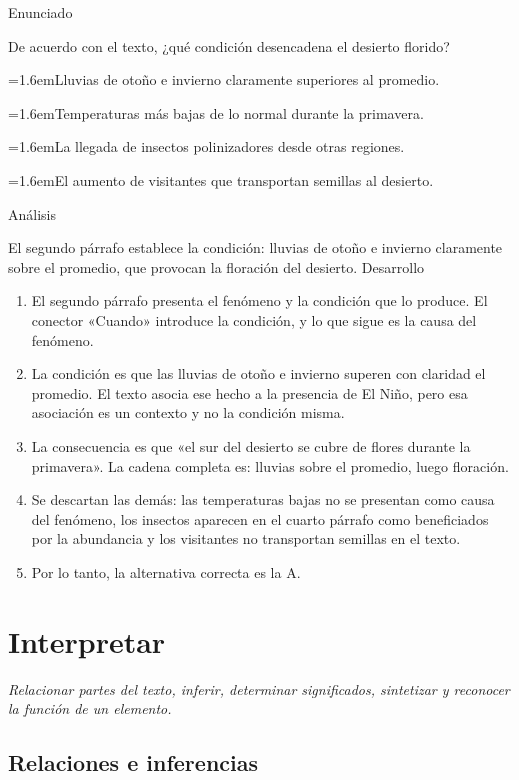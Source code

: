 \documentclass[10pt,a4paper,twocolumn]{article}
\newcommand{\alternativa}[2]{\par\noindent\hangindent=1.6em\hangafter=1\makebox[1.6em][l]{\tecla{#1}}#2\par}
\newcommand{\clave}[1]{\par\smallskip{\sffamily\footnotesize\color{esmeralda} Clave \teclaok{#1}}\par}
\begin{document}
\begin{ejemplo}
{\sffamily\footnotesize\color{zinc500} Enunciado}\par
De acuerdo con el texto, ¿qué condición desencadena el desierto florido?
\alternativa{A}{Lluvias de otoño e invierno claramente superiores al promedio.}
\alternativa{B}{Temperaturas más bajas de lo normal durante la primavera.}
\alternativa{C}{La llegada de insectos polinizadores desde otras regiones.}
\alternativa{D}{El aumento de visitantes que transportan semillas al desierto.}
\clave{A}
{\sffamily\footnotesize\color{zinc500} Análisis}\par El segundo párrafo establece la condición: lluvias de otoño e invierno claramente sobre el promedio, que provocan la floración del desierto.
{\sffamily\footnotesize\color{zinc500} Desarrollo}
\begin{enumerate}
  \item El segundo párrafo presenta el fenómeno y la condición que lo produce. El conector «Cuando» introduce la condición, y lo que sigue es la causa del fenómeno.
  \item La condición es que las lluvias de otoño e invierno superen con claridad el promedio. El texto asocia ese hecho a la presencia de El Niño, pero esa asociación es un contexto y no la condición misma.
  \item La consecuencia es que «el sur del desierto se cubre de flores durante la primavera». La cadena completa es: lluvias sobre el promedio, luego floración.
  \item Se descartan las demás: las temperaturas bajas no se presentan como causa del fenómeno, los insectos aparecen en el cuarto párrafo como beneficiados por la abundancia y los visitantes no transportan semillas en el texto.
  \item Por lo tanto, la alternativa correcta es la A.
\end{enumerate}
\end{ejemplo}

\section{Interpretar}

{\itshape\color{zinc700} Relacionar partes del texto, inferir, determinar significados, sintetizar y reconocer la función de un elemento.}

\subsection{Relaciones e inferencias}
\end{document}
